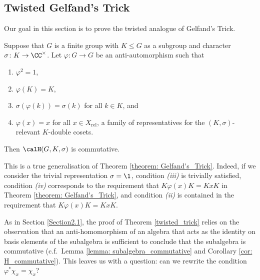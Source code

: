 
\subsection{Twisted Gelfand's Trick}\label{Section2.3}
Our goal in this section is to prove the twisted analogue of Gelfand's Trick.
\begin{thm}\label{twisted_trick}
	Suppose that $G$ is a finite group with $K\leq G$ as a subgroup and character $\sigma\colon K\to\CC^\times$.
	Let $\varphi\colon G\to G$ be an anti-automorphism such that
	\begin{enumerate}[\itshape(i)]
		\item $\varphi^2=1$,
		\item $\varphi(K)=K$,
		\item $\sigma(\varphi(k))=\sigma(k)$ for all $k\in K$, and
		\item $\varphi(x) = x$ for all $x\in X_\mathrm{rel}$, a family of representatives for the $(K,\sigma)$-relevant $K$-double cosets.
	\end{enumerate}
	Then $\calH(G,K,\sigma)$ is commutative.
\end{thm}
This is a true generalisation of Theorem \ref{theorem: Gelfand's_Trick}.
Indeed, if we consider the trivial representation $\sigma=\1$, condition {\itshape(iii)} is trivially satisfied, condition {\itshape(iv)} corresponds to the requirement that $K\varphi(x)K=KxK$ in Theorem \ref{theorem: Gelfand's_Trick}, and condition {\itshape(ii)} is contained in the requirement that $K\varphi(x)K=KxK$.

As in Section \ref{Section2.1}, the proof of Theorem \ref{twisted_trick} relies on the observation that an anti-homomorphism of an algebra that acts as the identity on basis elements of the subalgebra is sufficient to conclude that the subalgebra is commutative (c.f.\ Lemma \ref{lemma: subalgebra_commutative} and Corollary \ref{cor: H_commutative}).
This leaves us with a question: can we rewrite the condition $\varphi^\ast \chi_x = \chi_x$?

